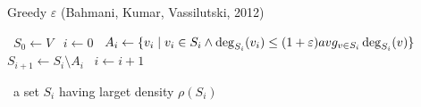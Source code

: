 \begin{algorithm}
    \caption{Greedy $\varepsilon$ (Bahmani, Kumar, Vassilutski, 2012)}\label{alg:greedy_epsilon}
    \begin{algorithmic}%
            \State~$S_0 \gets V$
            \State~$i \gets 0$
                    \State~$A_i \gets \{ v_i \; \vert \; v_i \in S_i \wedge \deg_{S_i}(v_i) \leq (1+\varepsilon)avg_{v \in S_i} \deg_{S_i}(v) \}$
                    \State~$S_{i+1} \gets S_i \setminus A_i$
                    \State~$i \gets i+1$
                \EndWhile
                
            \Return~a set $S_i$ having larget density $\rho(S_i)$
        \EndProcedure
    \end{algorithmic}
\end{algorithm}